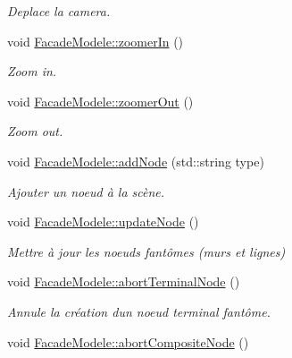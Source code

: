 \begin{DoxyCompactItemize}
\begin{DoxyCompactList}\small\item\em Deplace la camera. \end{DoxyCompactList}\item 
void \hyperlink{group__inf2990_ga8f027fa8ccba48bada7b91b1bc32ed96}{Facade\+Modele\+::zoomer\+In} ()
\begin{DoxyCompactList}\small\item\em Zoom in. \end{DoxyCompactList}\item 
void \hyperlink{group__inf2990_gaa2e1aeaa2fd10b16cf8b5f406d6270c8}{Facade\+Modele\+::zoomer\+Out} ()
\begin{DoxyCompactList}\small\item\em Zoom out. \end{DoxyCompactList}\item 
void \hyperlink{group__inf2990_ga22eeedd655650984efa7da6d3d2564eb}{Facade\+Modele\+::add\+Node} (std\+::string type)
\begin{DoxyCompactList}\small\item\em Ajouter un noeud à la scène. \end{DoxyCompactList}\item 
void \hyperlink{group__inf2990_ga3d780d2a98e5abe59033ba9791065d7d}{Facade\+Modele\+::update\+Node} ()
\begin{DoxyCompactList}\small\item\em Mettre à jour les noeuds fantômes (murs et lignes) \end{DoxyCompactList}\item 
void \hyperlink{group__inf2990_gaf1099ad811d94b7ede2572fbd3c7c89e}{Facade\+Modele\+::abort\+Terminal\+Node} ()
\begin{DoxyCompactList}\small\item\em Annule la création d\textquotesingle{}un noeud terminal fantôme. \end{DoxyCompactList}\item 
\hypertarget{group__inf2990_gaf17fbb34428b0e0a22ffcdc245e52d19}{}void \hyperlink{group__inf2990_gaf17fbb34428b0e0a22ffcdc245e52d19}{Facade\+Modele\+::abort\+Composite\+Node} ()\label{group__inf2990_gaf17fbb34428b0e0a22ffcdc245e52d19}


\end{DoxyCompactItemize}

